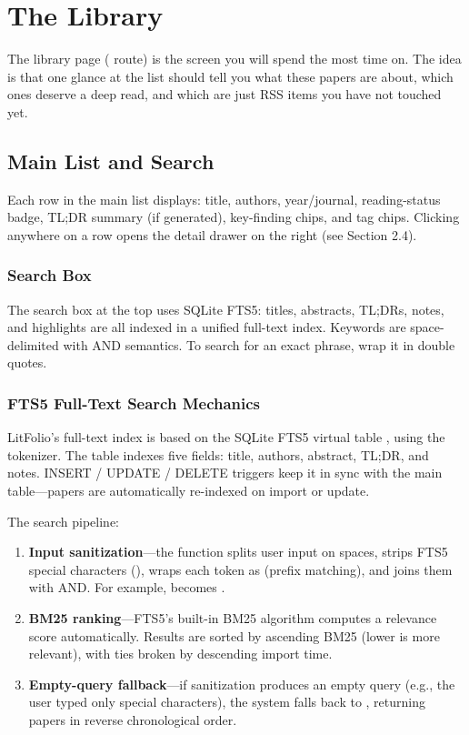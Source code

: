 \chapter{The Library}
\label{ch:library}

The library page ( route) is the screen you will spend the most time on.
The idea is that one glance at the list should tell you what these papers are
about, which ones deserve a deep read, and which are just RSS items you have not
touched yet.

\section{Main List and Search}

Each row in the main list displays: title, authors, year/journal, reading-status badge,
TL;DR summary (if generated), key-finding chips, and tag chips. Clicking anywhere on
a row opens the detail drawer on the right (see Section 2.4).

\subsection{Search Box}

The search box at the top uses SQLite FTS5: titles, abstracts, TL;DRs, notes, and
highlights are all indexed in a unified full-text index. Keywords are space-delimited
with AND semantics. To search for an exact phrase, wrap it in double quotes.

\subsection{FTS5 Full-Text Search Mechanics}

LitFolio's full-text index is based on the SQLite FTS5 virtual table ,
using the  tokenizer. The table indexes five fields: title, authors,
abstract, TL;DR, and notes. INSERT / UPDATE / DELETE triggers keep it in sync with
the  main table---papers are automatically re-indexed on import or update.

The search pipeline:

\begin{enumerate}
  \item \textbf{Input sanitization}---the  function splits user input
    on spaces, strips FTS5 special characters (), wraps each token as
     (prefix matching), and joins them with AND. For example,
     becomes .
  \item \textbf{BM25 ranking}---FTS5's built-in BM25 algorithm computes a relevance
    score automatically. Results are sorted by ascending BM25 (lower is more relevant),
    with ties broken by descending import time.
  \item \textbf{Empty-query fallback}---if sanitization produces an empty query (e.g.,
    the user typed only special characters), the system falls back to ,
    returning papers in reverse chronological order.
\end{enumerate}

